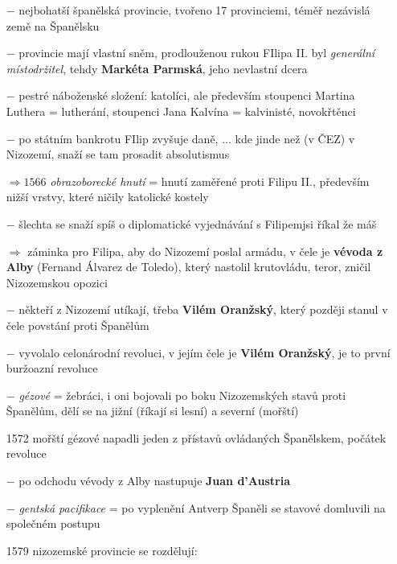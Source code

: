 \documentclass{article}
\begin{document}
\begin{itemize}
    \vspace{-0.5em}
    \setlength\itemsep{0.15em}
    \item[$-$] nejbohatší španělská provincie, tvořeno 17 provinciemi, téměř nezávislá země na Španělsku
    \item[$-$] provincie mají vlastní sněm, prodlouženou rukou FIlipa II. byl \textit{generální místodržitel}, tehdy \textbf{Markéta Parmská}, jeho nevlastní dcera
    \item[$-$] pestré náboženské složení: katolíci, ale především stoupenci Martina Luthera = lutherání, stoupenci Jana Kalvína = kalvinisté, novokřtěnci
    \item[$-$] po státním bankrotu FIlip zvyšuje daně, ... kde jinde než (v ČEZ) v Nizozemí, snaží se tam prosadit absolutismus
    \item[$\Rightarrow 1566$] \textit{obrazoborecké hnutí} = hnutí zaměřené proti Filipu II., především nižší vrstvy, které ničily katolické kostely
    \item[$-$] šlechta se snaží spíš o diplomatické vyjednávání s Filipemjsi říkal že máš
    \item[$\Rightarrow$] záminka pro Filipa, aby do Nizozemí poslal armádu, v čele je \textbf{vévoda z Alby} (Fernand Álvarez de Toledo), který nastolil krutovládu, teror, zničil Nizozemskou opozici
    \item[$-$] někteří z Nizozemí utíkají, třeba \textbf{Vilém Oranžský}, který později stanul v čele povstání proti Španělům
    \item[$-$]  vyvolalo celonárodní revoluci, v jejím čele je \textbf{Vilém Oranžský}, je to první buržoazní revoluce
    \item[$-$] \textit{gézové} = žebráci, i oni bojovali po boku Nizozemských stavů proti Španělům, dělí se na jižní (říkají si lesní) a severní (mořští)
    \item[1572] mořští gézové napadli jeden z přístavů ovládaných Španělskem, počátek revoluce
    \item[$-$] po odchodu vévody z Alby nastupuje \textbf{Juan d'Austria}
    \item[$-$] \textit{gentská pacifikace} = po vyplenění Antverp Španěli se stavové domluvili na společném postupu
    \item[1579] nizozemské provincie se rozdělují:
    \begin{itemize}
        \vspace{-0.5em}
        \setlength\itemsep{0.15em}

\end{itemize}
\end{itemize}
\end{document}
